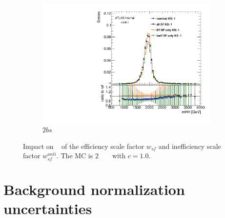 \begin{figure}[htb!]
    \\
    \begin{subfigure}[b]{0.45\textwidth}
        \includegraphics[width=\textwidth,angle=-90]{figures/boosted/AppendixbSF/directcompare_mHH_l_bSF_2000_FT_EFF_Eigen_B_0__1down_TwoTag_split_.pdf}
        \caption{$2bs$}
        \label{fig:signal_bsyst_reduction-2b}
    \end{subfigure}
  \caption{Impact on \mtwoJ~ of the efficiency scale factor $w_{sf}$ and inefficiency scale factor $w_{sf}^{anti}$. The MC is $2$ \TeV~ \Grav~ with $c=1.0$.}
  \label{fig:signal_bsyst_reduction}
\end{figure}


\section{Background normalization uncertainties}
\label{sec:non-closure-mu-qcd}

